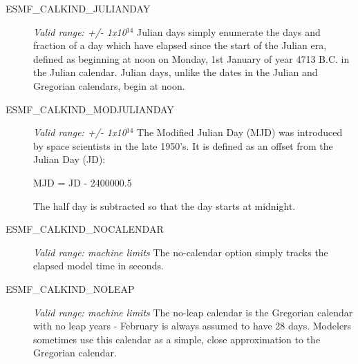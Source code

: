 \begin{description}
\item [ESMF\_CALKIND\_JULIANDAY] 
{\it Valid range:  +/- 1x10$^{14}$} 
\newline Julian days simply enumerate the days and fraction of a day which 
have elapsed since the start of the Julian era, defined as beginning at noon 
on Monday, 1st January of year 4713 B.C. in the Julian calendar.  Julian days, 
unlike the dates in the Julian and Gregorian calendars, begin at noon.

\item [ESMF\_CALKIND\_MODJULIANDAY]
{\it Valid range:  +/- 1x10$^{14}$}
\newline The Modified Julian Day (MJD) was introduced by space scientists in
 the late 1950's.  It is defined as an offset from the Julian Day (JD):

MJD = JD - 2400000.5

The half day is subtracted so that the day starts at midnight.

\item [ESMF\_CALKIND\_NOCALENDAR] 
{\it Valid range: machine limits}
\newline The no-calendar option simply tracks the elapsed model time in seconds.

\item [ESMF\_CALKIND\_NOLEAP]
{\it Valid range: machine limits} 
\newline The no-leap calendar is the Gregorian calendar with no leap years - 
February is always assumed to have 28 days.  Modelers sometimes use this 
calendar as a simple, close approximation to the Gregorian calendar.

\end{description}

